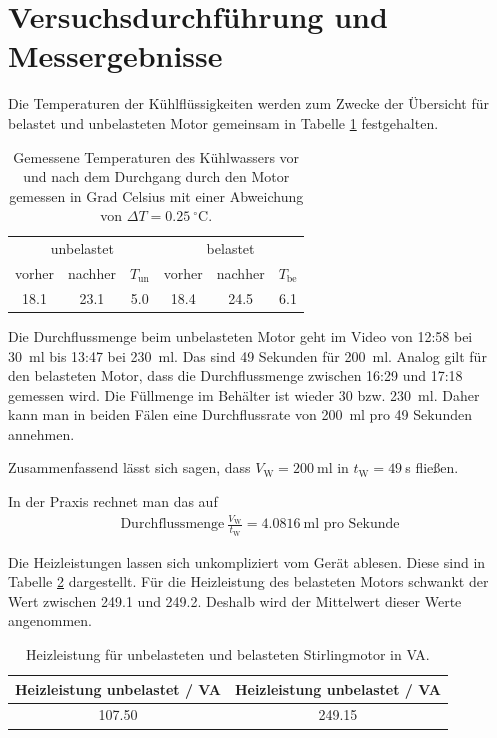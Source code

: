 \documentclass{article}
\begin{document}
\newpage
\section{Versuchsdurchführung und Messergebnisse}

Die Temperaturen der Kühlflüssigkeiten werden zum Zwecke der Übersicht für belastet und unbelasteten Motor gemeinsam in Tabelle \ref{tab:kuehltemp} festgehalten.

\begin{table}[H]
\caption{Gemessene Temperaturen des Kühlwassers vor und nach dem Durchgang durch den Motor gemessen in Grad Celsius mit einer Abweichung von $\Delta T = 0.25~^\circ$C.}
\label{tab:kuehltemp}
\begin{tabular}{ccc|ccc}
\multicolumn{3}{c|}{unbelastet} & \multicolumn{3}{c}{belastet} \\
vorher & nachher & $T_\text{un}$ & vorher & nachher & $T_\text{be}$ \\
\hline
18.1 & 23.1 & 5.0 & 18.4 & 24.5 & 6.1
\end{tabular}
\end{table}

Die Durchflussmenge beim unbelasteten Motor geht im Video von 12:58 bei 30~ml bis 13:47 bei 230~ml. Das sind 49 Sekunden für 200~ml. Analog gilt für den belasteten Motor, dass die Durchflussmenge zwischen 16:29 und 17:18 gemessen wird. Die Füllmenge im Behälter ist wieder 30 bzw. 230~ml. Daher kann man in beiden Fälen eine Durchflussrate von 200~ml pro 49 Sekunden annehmen.

Zusammenfassend lässt sich sagen, dass $V_\text{W} = 200~$ml in $t_\text{W} = 49~$s fließen.

In der Praxis rechnet man das auf 
\begin{align}
\label{eq:menge}
\text{Durchflussmenge}~\frac{V_\text{W}}{t_\text{W}} = 4.0816~\text{ml pro Sekunde}
\end{align}


Die Heizleistungen lassen sich unkompliziert vom Gerät ablesen. Diese sind in Tabelle \ref{tab:heizleistung} dargestellt. Für die Heizleistung des belasteten Motors schwankt der Wert zwischen 249.1 und 249.2. Deshalb wird der Mittelwert dieser Werte angenommen.

\begin{table}[H]
\caption{Heizleistung für unbelasteten und belasteten Stirlingmotor in VA.}
\label{tab:heizleistung}
\begin{tabular}{c|c}
Heizleistung unbelastet / VA & Heizleistung unbelastet / VA \\
\hline
107.50 & 249.15

\end{tabular}
\end{table}
\end{document}
